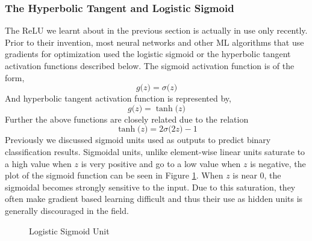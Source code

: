\documentclass[14pt]{extarticle}
\numberwithin{equation}{section}
\begin{document}
		\subsubsection{The Hyperbolic Tangent and Logistic Sigmoid}
		The ReLU we learnt about in the previous section is actually in use only recently. Prior to their invention, most neural networks and other ML algorithms that use gradients for optimization used the logistic sigmoid or the hyperbolic tangent activation functions described below.
		The sigmoid activation function is of the form,
		\begin{equation}
		g\big(z\big) = \sigma\big(z\big)
		\end{equation}
		And hyperbolic tangent activation function is represented by,
		\begin{equation}
		g\big(z\big) = \tanh\big(z\big)
		\end{equation}
		Further the above functions are closely related due to the relation $$\tanh\big(z\big) = 2\sigma\big(2z\big) - 1$$
		Previously we discussed sigmoid units used as outputs to predict binary classification results. Sigmoidal units, unlike element-wise linear units saturate to a high value when $z$ is very positive and go to a low value when $z$ is negative, the plot of the sigmoid function can be seen in Figure \ref{sigmoid}. When $z$ is near 0, the sigmoidal becomes strongly sensitive to the input. Due to this saturation, they often make gradient based learning difficult and thus their use as hidden units is generally discouraged in the field.
				\begin{figure}[H]
			\centering
			\setlength{\fboxsep}{5pt}%
			\setlength{\fboxrule}{1pt}%
			\caption{Logistic Sigmoid Unit
				\label{sigmoid}}
		\end{figure}
\end{document}
